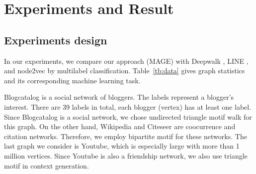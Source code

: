 \documentclass[letterpaper]{article}
\begin{document}
    \section{Experiments and Result}

        \subsection{Experiments design}
            
            In our experiments, we compare our approach (MAGE) with Deepwalk \cite{deepwalk}, 
            LINE \cite{line}, and node2vec \cite{node2vec} by multilabel classification. 
            Table~\ref{tb:data} gives graph statistics and its corresponding machine learning task. 

            \begin{table}
                \centering
                \label{tb:data}
                \caption{Dataset statistics}
            \end{table}

            Blogcatalog \cite{blogcatalog} is a social network of bloggers. The labels represent
            a blogger's interest. There are 39 labels in total, each blogger (vertex) has at least
            one label. Since Blogcatalog is a social network, we chose undirected triangle motif
            walk for this graph. On the other hand, Wikipedia \cite{wiki} and Citeseer \cite{citeseer} 
            are coocurrence and citation networks. Therefore, we employ bipartite motif for 
            these networks. The last graph we consider is Youtube, which is especially
            large with more than 1 million vertices. Since Youtube is also a friendship network,
            we also use triangle motif in context generation.
\end{document}
